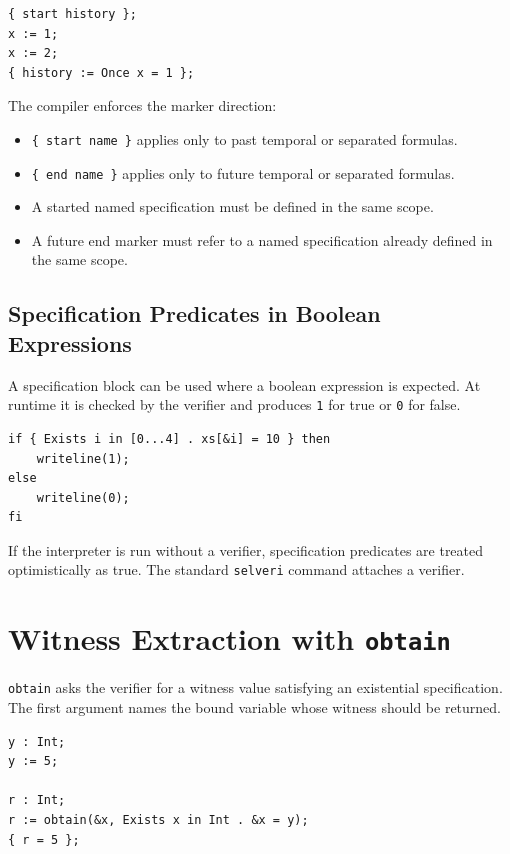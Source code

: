 \documentclass[11pt]{article}
\begin{document}
\begin{lstlisting}
{ start history };
x := 1;
x := 2;
{ history := Once x = 1 };
\end{lstlisting}

The compiler enforces the marker direction:

\begin{itemize}[nosep]
  \item \texttt{\{ start name \}} applies only to past temporal or separated formulas.
  \item \texttt{\{ end name \}} applies only to future temporal or separated formulas.
  \item A started named specification must be defined in the same scope.
  \item A future end marker must refer to a named specification already defined in the same scope.
\end{itemize}

\subsection{Specification Predicates in Boolean Expressions}

A specification block can be used where a boolean expression is expected. At runtime it is checked by the verifier and produces \texttt{1} for true or \texttt{0} for false.

\begin{lstlisting}
if { Exists i in [0...4] . xs[&i] = 10 } then
    writeline(1);
else
    writeline(0);
fi
\end{lstlisting}

If the interpreter is run without a verifier, specification predicates are treated optimistically as true. The standard \texttt{selveri} command attaches a verifier.

\section{Witness Extraction with \texttt{obtain}}

\texttt{obtain} asks the verifier for a witness value satisfying an existential specification. The first argument names the bound variable whose witness should be returned.

\begin{lstlisting}
y : Int;
y := 5;

r : Int;
r := obtain(&x, Exists x in Int . &x = y);
{ r = 5 };
\end{lstlisting}
\end{document}

